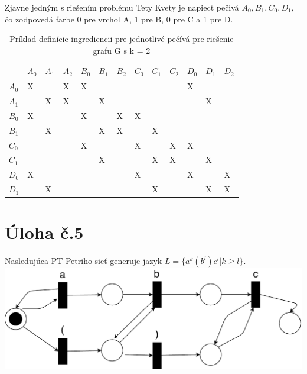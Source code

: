 \documentclass[10pt]{article}
\begin{document}
Zjavne jedným s riešením problému Tety Kvety je napiecť pečivá $A_0, B_1, C_0, D_1$, čo zodpovedá farbe 0 pre vrchol A, 1 pre B, 0 pre C a 1 pre D.

\begin{table}[ht]
\begin{tabular}{l|llllllllllll}
    & $A_0$ & $A_1$  &$A_2$  & $B_0$ &  $B_1$  &$B_2$ & $C_0$ &  $C_1$  &$C_2$  & $D_0$ & $D_1$  &$D_2$  \\ \hline
$A_0$  & X &  & X& X&  &  &  &  &  & X&  &  \\
$A_1$  &   & X& X&  & X&  &  &  &  &  & X&  \\
$B_0$  & X &  &  & X&  & X& X&  &  &  &  &  \\
$B_1$  &   & X&  &  & X& X&  & X&  &  &  &  \\
$C_0$  &   &  &  & X&  &  & X&  & X& X&  &  \\
$C_1$  &   &  &  &  & X&  &  & X& X&  & X&  \\
$D_0$  & X &  &  &  &  &  & X&  &  & X&  & X\\
$D_1$  &   & X&  &  &  &  &  & X&  &  & X& X 
\end{tabular}
    \caption{Príklad definície ingrediencii pre jednotlivé pečívá pre riešenie grafu G s k = 2}
\end{table}

\section*{Úloha č.5}
Nasledujúca PT Petriho sieť generuje jazyk $L = \{a^k(b^l)c^l | k \geq l \}$. \\
\includegraphics{petriNetFinalTake.pdf}
\end{document}
